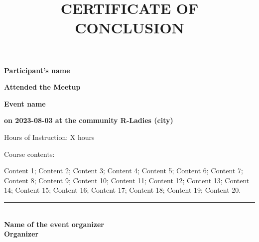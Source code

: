 \documentclass[14pt,landscape]{{extarticle}}
\title{CERTIFICATE OF CONCLUSION}
\author{}
\date{}
\providecommand{\opensans}{\normalfont}
\begin{document}
\opensans

\maketitle

\begin{center}

\LARGE \textbf {
Participant's name
} 

\vspace{1cm}

\normalsize \textbf {
Attended the Meetup 
}

\vspace{0.5cm}

\large \textbf {
Event name 
}


\large \textbf{
on 2023-08-03 at the community R-Ladies (city)
}

\vspace{0.5cm}

\large {
Hours of Instruction: X hours

}

\vspace{0.5cm}

\normalsize {
Course contents:
}

\vspace{0.5cm}

\normalsize 
\begin{varwidth}{0.8\textwidth}

Content 1; Content 2; Content 3; Content 4; Content 5; Content 6; Content 7; Content 8; Content 9; Content 10; Content 11; Content 12; Content 13; Content 14; Content 15; Content 16; Content 17; Content 18; Content 19; Content 20.

\end{varwidth}

\vfill

\vspace{0.5cm}



\rule[0in]{3in}{1pt}\\
\textbf{Name of the event organizer\\
        Organizer}\\
\vspace{0.5cm}

\end{center}
\end{document}
